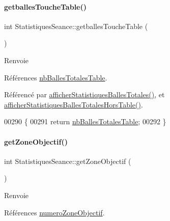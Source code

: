 \paragraph{\texorpdfstring{getballes\+Touche\+Table()}{getballesToucheTable()}}
{\footnotesize\ttfamily int Statistiques\+Seance\+::getballes\+Touche\+Table (\begin{DoxyParamCaption}{ }\end{DoxyParamCaption})}

\begin{DoxyReturn}{Renvoie}

\end{DoxyReturn}


Références \hyperlink{class_statistiques_seance_aa152a6f154cc832c3355342ecf94162a}{nb\+Balles\+Totales\+Table}.



Référencé par \hyperlink{class_statistiques_seance_a216b30bcfca71e425073a7ac90e59089}{afficher\+Statistiques\+Balles\+Totales()}, et \hyperlink{class_statistiques_seance_aebc6dad0ca5e4f99b08378077eae2c20}{afficher\+Statistiques\+Balles\+Totales\+Hors\+Table()}.


\begin{DoxyCode}
00290 \{
00291     \textcolor{keywordflow}{return} \hyperlink{class_statistiques_seance_aa152a6f154cc832c3355342ecf94162a}{nbBallesTotalesTable};
00292 \}
\end{DoxyCode}
\mbox{\label{class_statistiques_seance_a61c01cb1d35cda871e8243658213ee5b}} 
\paragraph{\texorpdfstring{get\+Zone\+Objectif()}{getZoneObjectif()}}
{\footnotesize\ttfamily int Statistiques\+Seance\+::get\+Zone\+Objectif (\begin{DoxyParamCaption}{ }\end{DoxyParamCaption})}

\begin{DoxyReturn}{Renvoie}

\end{DoxyReturn}


Références \hyperlink{class_statistiques_seance_a23226867e4a34cb41f8c07f3d8d42e49}{numero\+Zone\+Objectif}.



